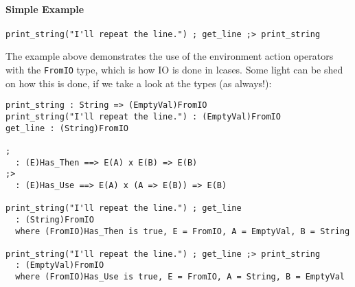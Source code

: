 \documentclass{article}
\begin{document}
\paragraph{Simple Example}
\begin{verbatim}
print_string("I'll repeat the line.") ; get_line ;> print_string
\end{verbatim}
The example above demonstrates the use of the environment action operators with
the \texttt{FromIO} type, which is how IO is done in lcases. Some light can
be shed on how this is done, if we take a look at the types (as always!):
\begin{verbatim}
print_string : String => (EmptyVal)FromIO
print_string("I'll repeat the line.") : (EmptyVal)FromIO
get_line : (String)FromIO

; 
  : (E)Has_Then ==> E(A) x E(B) => E(B) 
;>
  : (E)Has_Use ==> E(A) x (A => E(B)) => E(B) 

print_string("I'll repeat the line.") ; get_line
  : (String)FromIO
  where (FromIO)Has_Then is true, E = FromIO, A = EmptyVal, B = String

print_string("I'll repeat the line.") ; get_line ;> print_string
  : (EmptyVal)FromIO
  where (FromIO)Has_Use is true, E = FromIO, A = String, B = EmptyVal
\end{verbatim}
\end{document}

